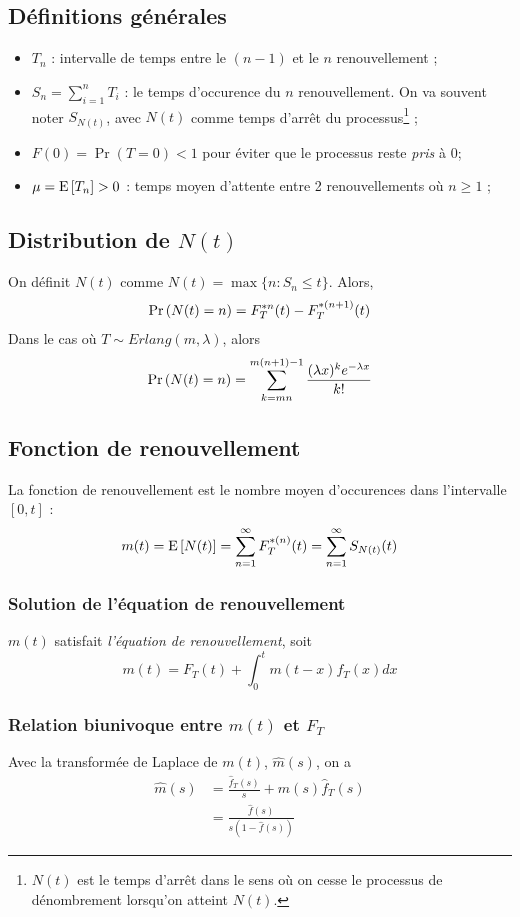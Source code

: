 \documentclass[10pt, french, landscape]{article}
\begin{document}
\begin{multicols*}{2}
\subsection*{Définitions générales}
\begin{itemize}
\item $T_n$ : intervalle de temps entre le $(n-1)$ et le $n$ renouvellement ;
\item $S_n = \sum_{i=1}^{n} T_i$ : le temps d'occurence du $n$ renouvellement. On va souvent noter $S_{N(t)}$, avec $N(t)$ comme temps d'arrêt du processus\footnote{$N(t)$ est le temps d'arrêt dans le sens où on cesse le processus de dénombrement lorsqu'on atteint $N(t)$.} ;
\item $F(0) = \Pr(T = 0) < 1$ pour éviter que le processus reste \textit{pris} à 0;
\item $\mu = \mathrm{E} \left[ T_n \right] > 0$ : temps moyen d'attente entre 2 renouvellements où $n \geq 1$ ;
\end{itemize}

\subsection*{Distribution de $N(t)$}
On définit $N(t)$ comme $N(t) = \max \{ n : S_n \leq t \}$. Alors,
\begin{align*}
\Pr \left( N(t) = n \right) = F_T^{\ast n}(t) - F_T^{\ast(n+1)}(t)
\end{align*}
Dans le cas où $T \sim Erlang(m, \lambda)$, alors
\[\Pr \left( N(t) = n \right)  = \sum_{k=mn}^{m(n+1) - 1} \frac{(\lambda x)^k e^{-\lambda x}}{k!} \]

\subsection*{Fonction de renouvellement}
La fonction de renouvellement est le nombre moyen d'occurences dans l'intervalle $[0,t]$  :
\[m(t) = \mathrm{E} \left[ N(t) \right] = \sum_{n=1}^{\infty} F_T^{\ast(n)}(t)  = \sum_{n=1}^{\infty} S_{N(t)}(t)  \]

\subsubsection*{Solution de l'équation de renouvellement}
$m(t)$ satisfait \emph{l'équation de renouvellement}, soit
\[m(t) = F_T(t) + \int_{0}^{t} m(t-x) f_T(x) dx  \]

\subsubsection*{Relation biunivoque entre $m(t)$ et $F_T$}
Avec la transformée de Laplace de $m(t)$, $\hat{m}(s)$, on a
\begin{align*}
\hat{m}(s) &  = \frac{\hat{f}_T(s)}{s} + \hat{m}(s) \hat{f}_T(s) \\
& = \frac{\hat{f}(s)}{s\left(1 - \hat{f}(s)    \right)}
\end{align*}



\end{multicols*}
\end{document}
